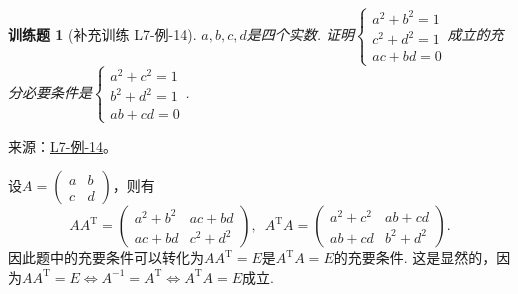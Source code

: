 \documentclass[UTF8,12pt,a4paper,fontset=fandol]{ctexart}
\newtheorem{exercise}{训练题}[section]
\begin{document}
\begin{exercise}[补充训练 L7-例-14]\label{prob:L7-例-14}
$a,b,c,d$是四个实数. 证明$\begin{cases}
            a^2+b^2=1 \\
            c^2+d^2=1 \\
            ac+bd=0
        \end{cases}$成立的充分必要条件是$\begin{cases}
            a^2+c^2=1 \\
            b^2+d^2=1 \\
            ab+cd=0
        \end{cases}$.
\end{exercise}
\noindent 来源：\href{https://github.com/yhwu-is/Linear-Algebra-Left-Undone/blob/new/%E8%AE%B2%E4%B9%89/%E4%B8%93%E9%A2%98/7%20%E7%BA%BF%E6%80%A7%E6%98%A0%E5%B0%84%E7%9F%A9%E9%98%B5%E8%A1%A8%E7%A4%BA%E4%B8%8E%E7%9F%A9%E9%98%B5%E8%BF%90%E7%AE%97%E5%9F%BA%E7%A1%80.tex}{L7-例-14}。
\begin{solve}
设$A=\begin{pmatrix}
            a & b \\ c & d
        \end{pmatrix}$，则有
    \[AA^\mathrm{T}=\begin{pmatrix}
            a^2+b^2 & ac+bd \\ ac+bd & c^2+d^2
        \end{pmatrix},\enspace A^\mathrm{T}A=\begin{pmatrix}
            a^2+c^2 & ab+cd \\ ab+cd & b^2+d^2
        \end{pmatrix}.\]
    因此题中的充要条件可以转化为$AA^\mathrm{T}=E$是$A^\mathrm{T}A=E$的充要条件. 这是显然的，因为$AA^\mathrm{T}=E\iff A^{-1}=A^\mathrm{T}\iff A^\mathrm{T}A=E$成立.
\end{solve}
\end{document}
